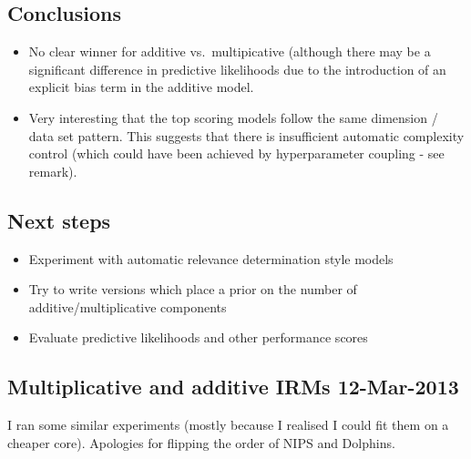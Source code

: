 \documentclass[twoside,11pt]{article}
\begin{document}
\subsection{Conclusions}

\begin{itemize}
\item No clear winner for additive vs.~multipicative (although there may be a significant difference in predictive likelihoods due to the introduction of an explicit bias term in the additive model.
\item Very interesting that the top scoring models follow the same dimension / data set pattern. This suggests that there is insufficient automatic complexity control (which could have been achieved by hyperparameter coupling - see remark).
\end{itemize}

\subsection{Next steps}

\begin{itemize}
\item Experiment with automatic relevance determination style models
\item Try to write versions which place a prior on the number of additive/multiplicative components
\item Evaluate predictive likelihoods and other performance scores
\end{itemize}

\subsection{Multiplicative and additive IRMs 12-Mar-2013}

I ran some similar experiments (mostly because I realised I could fit them on a cheaper core).
Apologies for flipping the order of NIPS and Dolphins.
\end{document}
